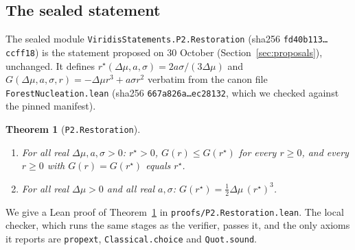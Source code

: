 \documentclass[11pt]{article}
\newtheorem{theorem}{Theorem}
\theoremstyle{definition}
\theoremstyle{remark}
\begin{document}
\subsection{The sealed statement}
The sealed module \texttt{ViridisStatements.P2.Restoration} (sha256 \texttt{fd40b113\ldots ccff18}) is the statement
proposed on 30 October (Section~\ref{sec:proposals}), unchanged.
It defines $r^\star(\Delta\mu,a,\sigma)=2a\sigma/(3\Delta\mu)$ and $G(\Delta\mu,a,\sigma,r)=-\Delta\mu r^3+a\sigma r^2$
verbatim from the canon file \texttt{ForestNucleation.lean} (sha256 \texttt{667a826a\ldots ec28132}, which we checked
against the pinned manifest).
\begin{theorem}[\texttt{P2.Restoration}]\label{thm:restoration}
\begin{enumerate}
\item[(i)] For all real $\Delta\mu,a,\sigma>0$: $r^\star>0$, $G(r)\le G(r^\star)$ for every $r\ge 0$, and every $r\ge0$ with
$G(r)=G(r^\star)$ equals $r^\star$.
\item[(ii)] For all real $\Delta\mu>0$ and all real $a,\sigma$: $G(r^\star)=\tfrac12\Delta\mu\,(r^\star)^3$.
\end{enumerate}
\end{theorem}
We give a Lean proof of Theorem~\ref{thm:restoration} in \texttt{proofs/P2.Restoration.lean}.
The local checker, which runs the same stages as the verifier, passes it, and the only axioms it reports are
\texttt{propext}, \texttt{Classical.choice} and \texttt{Quot.sound}.
\end{document}
